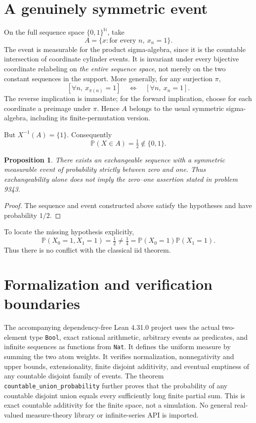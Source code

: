 \documentclass[11pt]{article}
\newtheorem{proposition}{Proposition}
\begin{document}
\section{A genuinely symmetric event}
On the full sequence space $\{0,1\}^{\mathbb N}$, take
\[
 A=\{x: \text{for every }n,\ x_n=1\}.
\]
The event is measurable for the product sigma-algebra, since it is the countable intersection of coordinate cylinder events. It is invariant under every bijective coordinate relabeling on \emph{the entire sequence space}, not merely on the two constant sequences in the support. More generally, for any surjection $\pi$,
\[
 [\forall n,\ x_{\pi(n)}=1]\quad\Longleftrightarrow\quad[\forall n,\ x_n=1].
\]
The reverse implication is immediate; for the forward implication, choose for each coordinate a preimage under $\pi$. Hence $A$ belongs to the usual symmetric sigma-algebra, including its finite-permutation version.

But $X^{-1}(A)=\{1\}$. Consequently
\[
 \mathbb P(X\in A)=\tfrac12\notin\{0,1\}.
\]
\begin{proposition}
There exists an exchangeable sequence with a symmetric measurable event of probability strictly between zero and one. Thus exchangeability alone does not imply the zero--one assertion stated in problem 9343.
\end{proposition}
\begin{proof}
The sequence and event constructed above satisfy the hypotheses and have probability $1/2$.
\end{proof}
To locate the missing hypothesis explicitly,
\[
 \mathbb P(X_0=1,X_1=1)=\tfrac12
 \ne \tfrac14=\mathbb P(X_0=1)\mathbb P(X_1=1).
\]
Thus there is no conflict with the classical iid theorem.

\section{Formalization and verification boundaries}
The accompanying dependency-free Lean 4.31.0 project uses the actual two-element type \texttt{Bool}, exact rational arithmetic, arbitrary events as predicates, and infinite sequences as functions from \texttt{Nat}. It defines the uniform measure by summing the two atom weights. It verifies normalization, nonnegativity and upper bounds, extensionality, finite disjoint additivity, and eventual emptiness of any countable disjoint family of events. The theorem \texttt{countable\_union\_probability} further proves that the probability of any countable disjoint union equals every sufficiently long finite partial sum. This is exact countable additivity for the finite space, not a simulation. No general real-valued measure-theory library or infinite-series API is imported.
\end{document}
